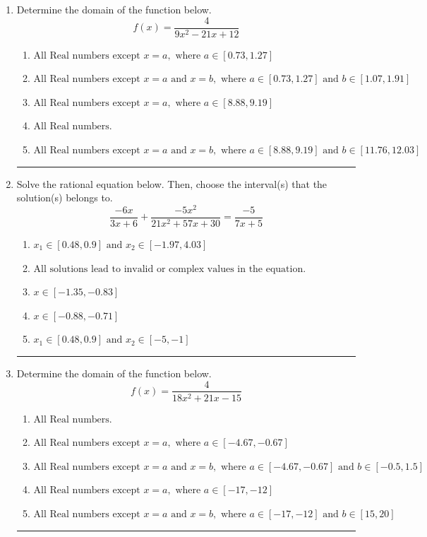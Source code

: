 \documentclass[14pt]{extbook}
\newcommand{\litem}[1]{\item#1\hspace*{-1cm}\rule{\textwidth}{0.4pt}}
\begin{document}
\begin{enumerate}
{\begin{enumerate}[label=\Alph*.]
\end{enumerate} }
\litem{
Determine the domain of the function below.\[ f(x) = \frac{4}{9x^{2} -21 x + 12} \]\begin{enumerate}[label=\Alph*.]
\item \( \text{All Real numbers except } x = a, \text{ where } a \in [0.73, 1.27] \)
\item \( \text{All Real numbers except } x = a \text{ and } x = b, \text{ where } a \in [0.73, 1.27] \text{ and } b \in [1.07, 1.91] \)
\item \( \text{All Real numbers except } x = a, \text{ where } a \in [8.88, 9.19] \)
\item \( \text{All Real numbers.} \)
\item \( \text{All Real numbers except } x = a \text{ and } x = b, \text{ where } a \in [8.88, 9.19] \text{ and } b \in [11.76, 12.03] \)

\end{enumerate} }
\litem{
Solve the rational equation below. Then, choose the interval(s) that the solution(s) belongs to.\[ \frac{-6x}{3x + 6} + \frac{-5x^{2}}{21x^{2} +57 x + 30} = \frac{-5}{7x + 5} \]\begin{enumerate}[label=\Alph*.]
\item \( x_1 \in [0.48, 0.9] \text{ and } x_2 \in [-1.97,4.03] \)
\item \( \text{All solutions lead to invalid or complex values in the equation.} \)
\item \( x \in [-1.35,-0.83] \)
\item \( x \in [-0.88,-0.71] \)
\item \( x_1 \in [0.48, 0.9] \text{ and } x_2 \in [-5,-1] \)

\end{enumerate} }
\litem{
Determine the domain of the function below.\[ f(x) = \frac{4}{18x^{2} +21 x -15} \]\begin{enumerate}[label=\Alph*.]
\item \( \text{All Real numbers.} \)
\item \( \text{All Real numbers except } x = a, \text{ where } a \in [-4.67, -0.67] \)
\item \( \text{All Real numbers except } x = a \text{ and } x = b, \text{ where } a \in [-4.67, -0.67] \text{ and } b \in [-0.5, 1.5] \)
\item \( \text{All Real numbers except } x = a, \text{ where } a \in [-17, -12] \)
\item \( \text{All Real numbers except } x = a \text{ and } x = b, \text{ where } a \in [-17, -12] \text{ and } b \in [15, 20] \)


\end{enumerate}}
\end{enumerate}
\end{document}
